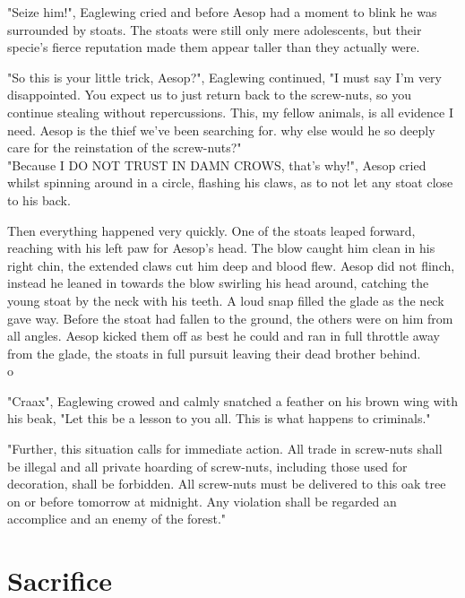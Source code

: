 \documentclass[smalldemyvopaper,11pt,twoside,onecolumn,openright,extrafontsizes]{memoir}
\begin{document}
"Seize him!", Eaglewing cried and before Aesop had a moment to blink he was surrounded by stoats. The stoats were still only mere adolescents, but their specie's fierce reputation made them appear taller than they actually were. 

"So this is your little trick, Aesop?", Eaglewing continued, "I must say I'm very disappointed. You expect us to just return back to the screw-nuts, so you continue stealing without repercussions. This, my fellow animals, is all evidence I need. Aesop is the thief we've been searching for. why else would he so deeply care for the reinstation of the screw-nuts?"\\


"Because I DO NOT TRUST IN DAMN CROWS, that's why!", Aesop cried whilst spinning around in a circle, flashing his claws, as to not let any stoat close to his back.

Then everything happened very quickly. One of the stoats leaped forward, reaching with his left paw for Aesop's head. The blow caught him clean in his right chin, the extended claws cut him deep and blood flew. Aesop did not flinch, instead he leaned in towards the blow swirling his head around, catching the young stoat by the neck with his teeth. A loud snap filled the glade as the neck gave way. Before the stoat had fallen to the ground, the others were on him from all angles. Aesop kicked them off as best he could and ran in full throttle away from the glade, the stoats in full pursuit leaving their dead brother behind.\\o

"Craax", Eaglewing crowed and calmly snatched a feather on his brown wing with his beak, "Let this be a lesson to you all. This is what happens to criminals."

"Further, this situation calls for immediate action. All trade in screw-nuts shall be illegal and all private hoarding of screw-nuts, including those used for decoration, shall be forbidden. All screw-nuts must be delivered to this oak tree on or before tomorrow at midnight. Any violation shall be regarded an accomplice and an enemy of the forest."


\chapter{Sacrifice}
\end{document}

